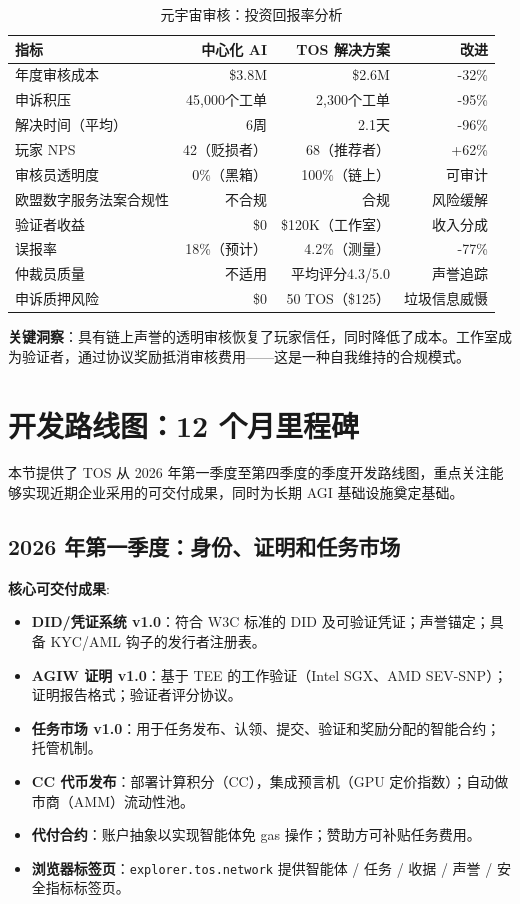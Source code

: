 \documentclass[11pt]{article}
\begin{document}
\begin{table}[H]
\centering
\caption{元宇宙审核：投资回报率分析}
\label{tab:metaverse-roi}
\begin{tabular}{@{}lrrr@{}}
\toprule
\textbf{指标} & \textbf{中心化 AI} & \textbf{TOS 解决方案} & \textbf{改进} \\ \midrule
年度审核成本 & \$3.8M & \$2.6M & -32\% \\
申诉积压 & 45,000个工单 & 2,300个工单 & -95\% \\
解决时间（平均） & 6周 & 2.1天 & -96\% \\
玩家 NPS & 42（贬损者） & 68（推荐者） & +62\% \\
审核员透明度 & 0\%（黑箱） & 100\%（链上） & 可审计 \\
欧盟数字服务法案合规性 & 不合规 & 合规 & 风险缓解 \\
验证者收益 & \$0 & \$120K（工作室） & 收入分成 \\
误报率 & 18\%（预计） & 4.2\%（测量） & -77\% \\
仲裁员质量 & 不适用 & 平均评分4.3/5.0 & 声誉追踪 \\
申诉质押风险 & \$0 & 50 TOS（\$125） & 垃圾信息威慑 \\
\bottomrule
\end{tabular}
\end{table}

\textbf{关键洞察}：具有链上声誉的透明审核恢复了玩家信任，同时降低了成本。工作室成为验证者，通过协议奖励抵消审核费用——这是一种自我维持的合规模式。

\section{开发路线图：12 个月里程碑}
\label{sec:12month-roadmap}

本节提供了 TOS 从 2026 年第一季度至第四季度的季度开发路线图，重点关注能够实现近期企业采用的可交付成果，同时为长期 AGI 基础设施奠定基础。

\subsection{2026 年第一季度：身份、证明和任务市场}

\textbf{核心可交付成果}:
\begin{itemize}[noitemsep]
  \item \textbf{DID/凭证系统 v1.0}：符合 W3C 标准的 DID 及可验证凭证；声誉锚定；具备 KYC/AML 钩子的发行者注册表。
  \item \textbf{AGIW 证明 v1.0}：基于 TEE 的工作验证（Intel SGX、AMD SEV-SNP）；证明报告格式；验证者评分协议。
  \item \textbf{任务市场 v1.0}：用于任务发布、认领、提交、验证和奖励分配的智能合约；托管机制。
  \item \textbf{CC 代币发布}：部署计算积分（CC），集成预言机（GPU 定价指数）；自动做市商（AMM）流动性池。
  \item \textbf{代付合约}：账户抽象以实现智能体免 gas 操作；赞助方可补贴任务费用。
  \item \textbf{浏览器标签页}：\texttt{explorer.tos.network} 提供智能体 / 任务 / 收据 / 声誉 / 安全指标标签页。
\end{itemize}
\end{document}
